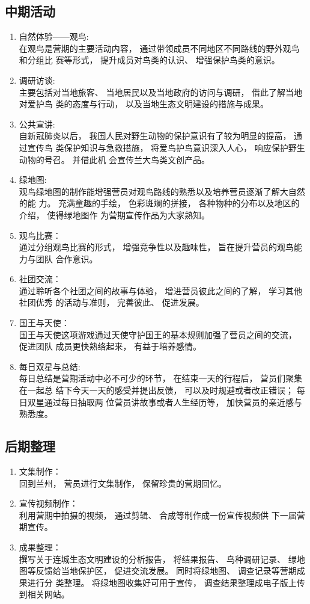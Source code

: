 \documentclass[UTF8,a4paper，12pt]{ctexart}
\begin{document}
\subsection{中期活动}
\begin{enumerate}[itemindent=1em]
    \item 自然体验——观鸟:\\在观鸟是营期的主要活动内容， 通过带领成员不同地区不同路线的野外观鸟和分组比
赛等形式， 提升成员对鸟类的认识、 增强保护鸟类的意识。
\item 调研访谈:\\主要包括对当地旅客、 当地居民以及当地政府的访问与调研， 借此了解当地对爱护鸟
类的态度与行动， 以及当地生态文明建设的措施与成果。
\item 公共宣讲:\\自新冠肺炎以后， 我国人民对野生动物的保护意识有了较为明显的提高， 通过宣传鸟
类保护知识与急救措施， 将爱鸟护鸟意识深入人心， 响应保护野生动物的号召。 并借此机
会宣传兰大鸟类文创产品。
\item 绿地图:\\观鸟绿地图的制作能增强营员对观鸟路线的熟悉以及培养营员逐渐了解大自然的能
力。 充满童趣的手绘， 色彩斑斓的拼接， 各种物种的分布以及地区的介绍， 使得绿地图作
为营期宣传作品为大家熟知。
\item 观鸟比赛：\\通过分组观鸟比赛的形式， 增强竞争性以及趣味性， 旨在提升营员的观鸟能力与团队
合作意识。
\item 社团交流：\\通过聆听各个社团之间的故事与体验， 增进营员彼此之间的了解， 学习其他社团优秀
的活动与准则， 完善彼此、 促进发展。
\item 国王与天使：\\国王与天使这项游戏通过天使守护国王的基本规则加强了营员之间的交流， 促进团队
成员更快熟络起来， 有益于培养感情。
\item 每日双星与总结:\\每日总结是营期活动中必不可少的环节， 在结束一天的行程后， 营员们聚集在一起总
结下今天一天的感受并提出反馈， 可以及时规避或者改正错误； 每日双星通过每日抽取两
位营员讲故事或者人生经历等， 加快营员的亲近感与熟悉度。
\end{enumerate}
\subsection{后期整理}
\begin{enumerate}[itemindent=1em]
\item 文集制作：\\ 回到兰州， 营员进行文集制作， 保留珍贵的营期回忆。
\item 宣传视频制作：\\ 利用营期中拍摄的视频， 通过剪辑、 合成等制作成一份宣传视频供
下一届营期宣传。
\item 成果整理：\\ 撰写关于连城生态文明建设的分析报告， 将结果报告、 鸟种调研记录、
绿地图等反馈给当地保护区， 促进交流发展。 同时将绿地图、 调查记录等营期成果进行分
类整理。 将绿地图收集好可用于宣传， 调查结果整理成电子版上传到相关网站。
\end{enumerate}
\end{document}
